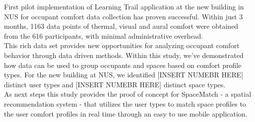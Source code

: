 
First pilot implementation of Learning Trail application at the new building in NUS for occupant comfort data collection has proven successful. Within just 3 months, 1163 data points of thermal, visual and aural comfort were obtained from the 616 participants, with minimal administrative overhead.\\

This rich data set provides new opportunities for analyzing occupant comfort behavior through data driven methods. Within this study, we've demonstrated how data can be used to group occupants and spaces based on comfort profile types. For the new building at NUS, we identified [INSERT NUMEBR HERE] distinct user types and [INSERT NUMEBR HERE] distinct space types.\\

As next steps this study provides the proof of concept for SpaceMatch - a spatial recommendation system - that utilizes the user types to match space profiles to the user comfort profiles in real time through an easy to use mobile application.
